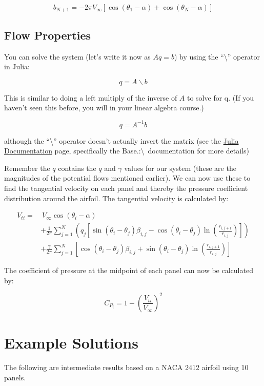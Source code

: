 \documentclass{article}%
\begin{document}
\begin{equation}
	b_{N+1} = -2\pi V_{\infty} \left[ \cos(\theta_1 - \alpha) + \cos(\theta_N - \alpha) \right]
\end{equation}

\subsection*{Flow Properties}

You can solve the system (let's write it now as $Aq=b$) by using the ``\textbackslash'' operator in Julia:

\begin{equation}
q = A \backslash b
\end{equation}

This is similar to doing a left multiply of the inverse of $A$ to solve for q. (If you haven't seen this before, you will in your linear algebra course.)

\begin{equation}
q = A^{-1} b
\end{equation}

\noindent although the ``\textbackslash'' operator doesn't actually invert the matrix (see the \href{https://docs.julialang.org/en/v1/stdlib/LinearAlgebra/}{Julia Documentation} page, specifically the Base.:\textbackslash~documentation for more details)

Remember the $q$ contains the $q$ and $\gamma$ values for our system (these are the magnitudes of the potential flows mentioned earlier). We can now use these to find the tangential velocity on each panel and thereby the pressure coefficient distribution around the airfoil.  The tangential velocity is calculated by:

\begin{equation}
	\begin{aligned}
		V_{ti} =& ~V_\infty \cos(\theta_i-\alpha) \\
		&+ \frac{1}{2\pi} \sum_{j=1}^N \left( q_j\left[ \sin(\theta_i-\theta_j)\beta_{i,j} - \cos(\theta_i-\theta_j) \ln\left(\frac{r_{i,j+1}}{r_{i,j}}\right) \right] \right)\\
		&+ \frac{\gamma}{2\pi} \sum_{j=1}^N \left[ \cos(\theta_i-\theta_j)\beta_{i,j} + \sin(\theta_i-\theta_j) \ln\left(\frac{r_{i,j+1}}{r_{i,j}}\right) \right]
	\end{aligned}
\end{equation}

The coefficient of pressure at the midpoint of each panel can now be calculated by:

\begin{equation}
	C_{P_i} = 1- \left(\frac{V_{ti}}{V_\infty}\right)^2
\end{equation}


\section*{Example Solutions}

The following are intermediate results based on a NACA 2412 airfoil using 10 panels.
\end{document}
